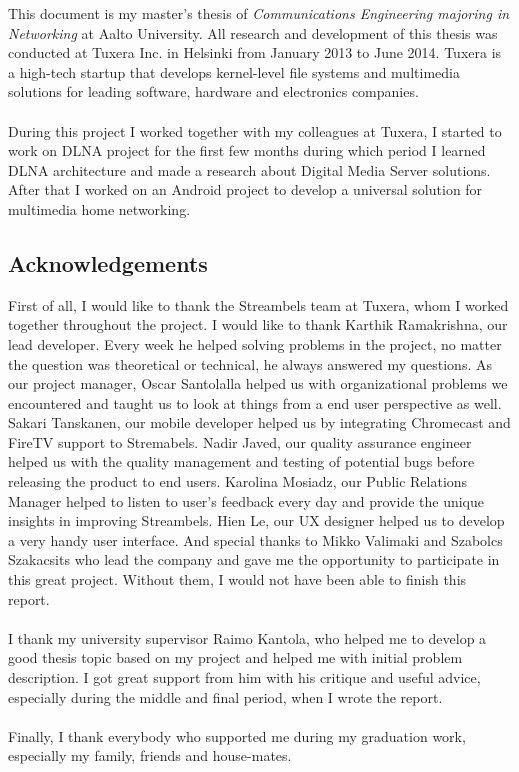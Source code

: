 
This document is my master's thesis of \textit{Communications Engineering majoring in
Networking} at Aalto University. All research and development of this thesis was
conducted at Tuxera Inc. in Helsinki from January 2013 to June 2014. Tuxera is a
high-tech startup that develops kernel-level file systems and multimedia solutions
for leading software, hardware and electronics companies.\\
\\
During this project I worked together with my colleagues at Tuxera, I started
to work on DLNA project for the first few months during which period I learned
DLNA architecture and made a research about Digital Media Server solutions.
After that I worked on an Android project to develop a universal solution for
multimedia home networking.
\subsection*{Acknowledgements}
First of all, I would like to thank the Streambels team at Tuxera, whom I worked
together throughout the project. I would like to thank Karthik Ramakrishna, our
lead developer. Every week he helped solving problems in the project,
no matter the question was theoretical or technical, he always answered my
questions. As our project manager, Oscar Santolalla helped us with
organizational problems we encountered and taught us to look at things from a
end user perspective as well. Sakari Tanskanen, our mobile developer helped us
by integrating Chromecast and FireTV support to Stremabels. Nadir Javed, our
quality assurance engineer helped us with the quality management and testing of
potential bugs before releasing the product to end users. Karolina Mosiadz, our
Public Relations Manager helped to listen to user's feedback every day and provide the unique
insights in improving Streambels. Hien Le, our UX designer helped us to develop
a very handy user interface. And special thanks to Mikko Valimaki and Szabolcs
Szakacsits who lead the company and gave me the opportunity to participate in
this great project. Without them, I would not have been able to finish this
report.\\
\\
I thank my university supervisor Raimo Kantola, who helped me to develop a good
thesis topic based on my project and helped me with initial problem description.
I got great support from him with his critique and useful advice, especially
during the middle and final period, when I wrote the report.\\
\\
Finally, I thank everybody who supported me during my graduation work,
especially my family, friends and house-mates.